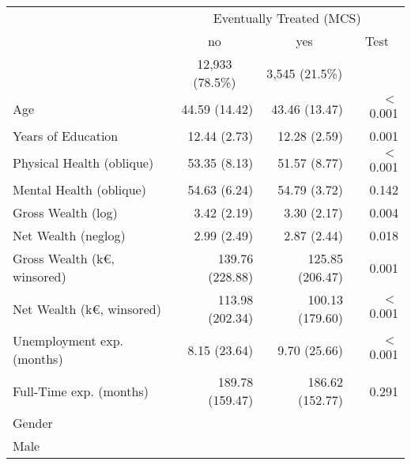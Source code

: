 \begin{tabular}{llll}
\cmidrule{1-4}
\multicolumn{1}{r}{} &
  \multicolumn{3}{c}{Eventually Treated (MCS)} \\
\multicolumn{1}{r}{} &
  \multicolumn{1}{c}{no} &
  \multicolumn{1}{c}{yes} &
  \multicolumn{1}{c}{Test} \\
\multicolumn{1}{r}{} &
  \multicolumn{1}{c}{12,933 (78.5\%)} &
  \multicolumn{1}{c}{3,545 (21.5\%)} &
  \multicolumn{1}{r}{} \\
\cmidrule{1-4}
\multicolumn{1}{l}{Age} &
  \multicolumn{1}{r}{44.59 (14.42)} &
  \multicolumn{1}{r}{43.46 (13.47)} &
  \multicolumn{1}{r}{$<$0.001} \\
\multicolumn{1}{l}{Years of Education} &
  \multicolumn{1}{r}{12.44 (2.73)} &
  \multicolumn{1}{r}{12.28 (2.59)} &
  \multicolumn{1}{r}{0.001} \\
\multicolumn{1}{l}{Physical Health (oblique)} &
  \multicolumn{1}{r}{53.35 (8.13)} &
  \multicolumn{1}{r}{51.57 (8.77)} &
  \multicolumn{1}{r}{$<$0.001} \\
\multicolumn{1}{l}{Mental Health (oblique)} &
  \multicolumn{1}{r}{54.63 (6.24)} &
  \multicolumn{1}{r}{54.79 (3.72)} &
  \multicolumn{1}{r}{0.142} \\
\multicolumn{1}{l}{Gross Wealth (log)} &
  \multicolumn{1}{r}{3.42 (2.19)} &
  \multicolumn{1}{r}{3.30 (2.17)} &
  \multicolumn{1}{r}{0.004} \\
\multicolumn{1}{l}{Net Wealth (neglog)} &
  \multicolumn{1}{r}{2.99 (2.49)} &
  \multicolumn{1}{r}{2.87 (2.44)} &
  \multicolumn{1}{r}{0.018} \\
\multicolumn{1}{l}{Gross Wealth (k€, winsored)} &
  \multicolumn{1}{r}{139.76 (228.88)} &
  \multicolumn{1}{r}{125.85 (206.47)} &
  \multicolumn{1}{r}{0.001} \\
\multicolumn{1}{l}{Net Wealth (k€, winsored)} &
  \multicolumn{1}{r}{113.98 (202.34)} &
  \multicolumn{1}{r}{100.13 (179.60)} &
  \multicolumn{1}{r}{$<$0.001} \\
\multicolumn{1}{l}{Unemployment exp. (months)} &
  \multicolumn{1}{r}{8.15 (23.64)} &
  \multicolumn{1}{r}{9.70 (25.66)} &
  \multicolumn{1}{r}{$<$0.001} \\
\multicolumn{1}{l}{Full-Time exp. (months)} &
  \multicolumn{1}{r}{189.78 (159.47)} &
  \multicolumn{1}{r}{186.62 (152.77)} &
  \multicolumn{1}{r}{0.291} \\
\multicolumn{1}{l}{Gender} &
  \multicolumn{1}{r}{} &
  \multicolumn{1}{r}{} &
  \multicolumn{1}{r}{} \\
\multicolumn{1}{l}{\hspace{1em}Male} &

\end{tabular}

